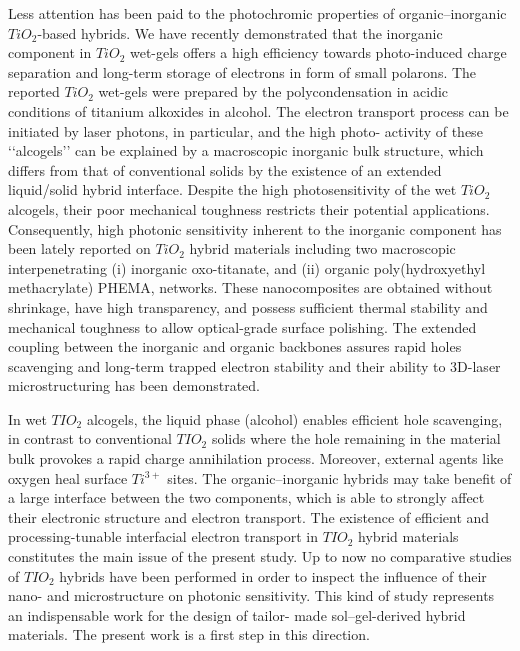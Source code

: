 Less attention has been paid to the photochromic properties of organic–inorganic $TiO_2$-based hybrids. We have recently demonstrated that the inorganic component in $TiO_2$ wet-gels offers a high efficiency towards photo-induced charge separation and long-term storage of electrons in form of small polarons. The reported $TiO_2$ wet-gels were prepared by the polycondensation in acidic conditions of titanium alkoxides in alcohol. The electron transport process can be initiated by laser photons, in particular, and the high photo- activity of these ‘‘alcogels’’ can be explained by a macroscopic inorganic bulk structure, which differs from that of conventional solids by the existence of an extended liquid/solid hybrid interface. Despite the high photosensitivity of the wet $TiO_2$ alcogels, their poor mechanical toughness restricts their potential applications. Consequently, high photonic sensitivity inherent to the inorganic component has been lately reported on $TiO_2$ hybrid materials including two macroscopic interpenetrating (i) inorganic oxo-titanate, and (ii) organic poly(hydroxyethyl methacrylate) PHEMA, networks. These nanocomposites are obtained without shrinkage, have high transparency, and possess sufficient thermal stability and mechanical toughness to allow optical-grade surface polishing. The extended coupling between the inorganic and organic backbones assures rapid holes scavenging and long-term trapped electron stability and their ability to 3D-laser microstructuring has been demonstrated.

In wet $TIO_2$ alcogels, the liquid phase (alcohol) enables efficient hole scavenging, in contrast to conventional $TIO_2$ solids where the hole remaining in the material bulk provokes a rapid charge annihilation process. Moreover, external agents like oxygen heal surface $Ti^{3+}$ sites. The organic–inorganic hybrids may take benefit of a large interface between the two components, which is able to strongly affect their electronic structure and electron transport. The existence of efficient and processing-tunable interfacial electron transport in $TIO_2$ hybrid materials constitutes the main issue of the present study. Up to now no comparative studies of $TIO_2$ hybrids have been performed in order to inspect the influence of their nano- and microstructure on photonic sensitivity. This kind of study represents an indispensable work for the design of tailor- made sol–gel-derived hybrid materials. The present work is a first step in this direction.
